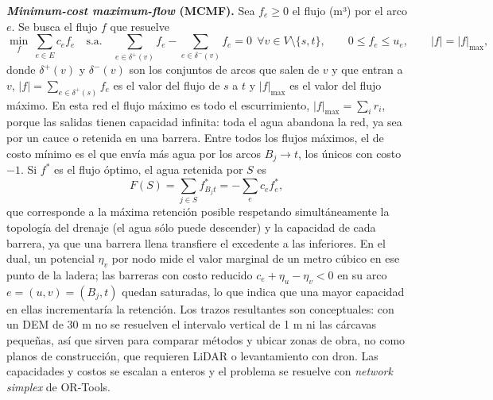 \textbf{\emph{Minimum-cost maximum-flow} (MCMF).} Sea $f_e\ge0$ el flujo (m³) por el arco $e$. Se busca el flujo $f$ que resuelve
\begin{equation}
\min_{f}\ \sum_{e\in E} c_e f_e \quad\text{s.a.}\quad \sum_{e\in\delta^+(v)} f_e-\sum_{e\in\delta^-(v)} f_e = 0\ \ \forall v\in V\setminus\{s,t\},\qquad 0\le f_e\le u_e,\qquad |f| = |f|_{\max},
\end{equation}
donde $\delta^{+}(v)$ y $\delta^{-}(v)$ son los conjuntos de arcos que salen de $v$ y que entran a $v$, $|f|=\sum_{e\in\delta^+(s)}f_e$ es el valor del flujo de $s$ a $t$ y $|f|_{\max}$ es el valor del flujo máximo. En esta red el flujo máximo es todo el escurrimiento, $|f|_{\max}=\sum_i r_i$, porque las salidas tienen capacidad infinita: toda el agua abandona la red, ya sea por un cauce o retenida en una barrera. Entre todos los flujos máximos, el de costo mínimo es el que envía más agua por los arcos $B_j\to t$, los únicos con costo $-1$. Si $f^\ast$ es el flujo óptimo, el agua retenida por $S$ es
\begin{equation}
F(S)=\sum_{j\in S} f^\ast_{B_j t}=-\sum_e c_e f^\ast_e ,
\end{equation}
que corresponde a la máxima retención posible respetando simultáneamente la topología del drenaje (el agua sólo puede descender) y la capacidad de cada barrera, ya que una barrera llena transfiere el excedente a las inferiores. En el dual, un potencial $\eta_v$ por nodo mide el valor marginal de un metro cúbico en ese punto de la ladera; las barreras con costo reducido $c_e+\eta_u-\eta_v<0$ en su arco $e=(u,v)=(B_j,t)$ quedan saturadas, lo que indica que una mayor capacidad en ellas incrementaría la retención. Los trazos resultantes son conceptuales: con un DEM de 30 m no se resuelven el intervalo vertical de 1 m ni las cárcavas pequeñas, así que sirven para comparar métodos y ubicar zonas de obra, no como planos de construcción, que requieren LiDAR o levantamiento con dron. Las capacidades y costos se escalan a enteros y el problema se resuelve con \emph{network simplex} de OR-Tools.

